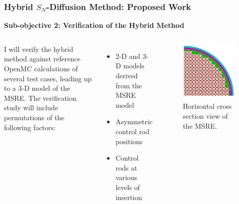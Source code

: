 \begin{frame}
  \frametitle{Hybrid $S_N$-Diffusion Method: Proposed Work}
  \textbf{Sub-objective 2: Verification of the Hybrid Method}
  \vspace{.2cm}

  \begin{columns}
    I will verify the hybrid method against reference OpenMC calculations of several test cases,
    leading up to a 3-D model of the MSRE. The verification study
    will include permutations of the following factors:
    \begin{itemize}
      \item 2-D and 3-D models derived from the MSRE model
      \item Asymmetric control rod positions
      \item Control rods at various levels of insertion
    \end{itemize}
    \begin{figure}
      \centering
      \includegraphics[width=\textwidth]{images/msre-slice}
      \caption{Horizontal cross section view of the MSRE.}
    \end{figure}
  \end{columns}
\end{frame}

